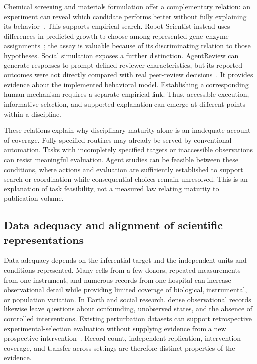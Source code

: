 Chemical screening and materials formulation offer a complementary relation: an experiment can reveal which candidate performs better without fully explaining its behavior~\cite{asd0734,burger2020}. This supports empirical search. Robot Scientist instead uses differences in predicted growth to choose among represented gene--enzyme assignments~\cite{king2004}; the assay is valuable because of its discriminating relation to those hypotheses. Social simulation exposes a further distinction. AgentReview can generate responses to prompt-defined reviewer characteristics, but its reported outcomes were not directly compared with real peer-review decisions~\cite{asd0786}. It provides evidence about the implemented behavioral model. Establishing a corresponding human mechanism requires a separate empirical link. Thus, accessible execution, informative selection, and supported explanation can emerge at different points within a discipline.

These relations explain why disciplinary maturity alone is an inadequate account of coverage. Fully specified routines may already be served by conventional automation. Tasks with incompletely specified targets or inaccessible observations can resist meaningful evaluation. Agent studies can be feasible between these conditions, where actions and evaluation are sufficiently established to support search or coordination while consequential choices remain unresolved. This is an explanation of task feasibility, not a measured law relating maturity to publication volume.

\subsection{Data adequacy and alignment of scientific representations}

Data adequacy depends on the inferential target and the independent units and conditions represented. Many cells from a few donors, repeated measurements from one instrument, and numerous records from one hospital can increase observational detail while providing limited coverage of biological, instrumental, or population variation. In Earth and social research, dense observational records likewise leave questions about confounding, unobserved states, and the absence of controlled interventions. Existing perturbation datasets can support retrospective experimental-selection evaluation without supplying evidence from a new prospective intervention~\cite{asd0020}. Record count, independent replication, intervention coverage, and transfer across settings are therefore distinct properties of the evidence.

